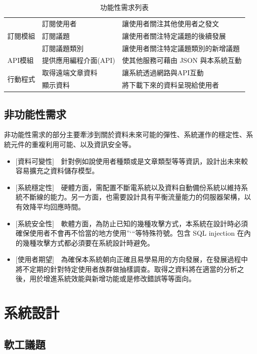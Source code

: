 \documentclass[11pt]{article}
\begin{document}
\begin{table}[t]
\begin{tabular}{ | l | l | l | }
\multirow{3}{*}{訂閱模組}
& 訂閱使用者 & 讓使用者關注其他使用者之發文 \\
& 訂閱議題 & 讓使用者關注特定議題的後續發展 \\
& 訂閱議題類別 & 讓使用者關注特定議題類別的新增議題 \\ \hline
\multirow{1}{*}{API模組}
& 提供應用編程介面(API) & 使其他服務可藉由 JSON 與本系統互動 \\ \hline
\multirow{2}{*}{行動程式}
& 取得遠端文章資料 & 讓系統透過網路與API互動 \\
& 顯示資料 & 將下載下來的資料呈現給使用者 \\ \hline
\end{tabular}
\caption{功能性需求列表}
\label{req}
\end{table}

\subsection{非功能性需求}
非功能性需求的部分主要牽涉到關於資料未來可能的彈性、系統運作的穩定性、系統元件的重複利用可能、以及資訊安全等。
\begin{itemize}
\item{[資料可變性]~~針對例如說使用者種類或是文章類型等等資訊，設計出未來較容易擴充之資料儲存模型。 }
\item{[系統穩定性]~~硬體方面，需配置不斷電系統以及資料自動備份系統以維持系統不斷線的能力。另一方面，也需要設計具有平衡流量能力的伺服器架構，以有效降平均回應時間。}
\item{[系統安全性]~~軟體方面，為防止已知的幾種攻擊方式，本系統在設計時必須確保使用者不會再不恰當的地方使用”‘“等特殊符號。包含 SQL injection 在內的幾種攻擊方式都必須要在系統設計時避免。}
\item{[使用者期望]~~為確保本系統朝向正確且易學易用的方向發展，在發展過程中將不定期的針對特定使用者族群做抽樣調查。取得之資料將在適當的分析之後，用於增進系統效能與新增功能或是修改錯誤等等面向。}
\end{itemize}

\section{系統設計}





\subsection{軟工議題}
\end{document}
